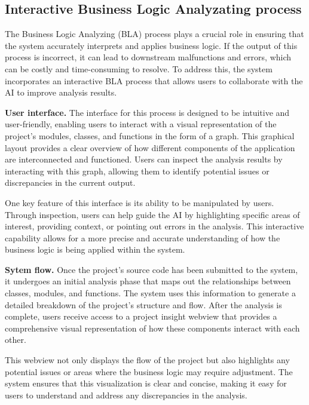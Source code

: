 \subsection{Interactive Business Logic Analyzating process}

\hspace{0.5cm}The Business Logic Analyzing (BLA) process plays a crucial role in ensuring that the system accurately interprets and applies business logic. If the output of this process is incorrect, it can lead to downstream malfunctions and errors, which can be costly and time-consuming to resolve. To address this, the system incorporates an interactive BLA process that allows users to collaborate with the AI to improve analysis results.

\hspace{0.5cm}\textbf{User interface.}	The interface for this process is designed to be intuitive and user-friendly, enabling users to interact with a visual representation of the project's modules, classes, and functions in the form of a graph. This graphical layout provides a clear overview of how different components of the application are interconnected and functioned. Users can inspect the analysis results by interacting with this graph, allowing them to identify potential issues or discrepancies in the current output.

\hspace{0.5cm}One key feature of this interface is its ability to be manipulated by users. Through inspection, users can help guide the AI by highlighting specific areas of interest, providing context, or pointing out errors in the analysis. This interactive capability allows for a more precise and accurate understanding of how the business logic is being applied within the system.

\hspace{0.5cm}\textbf{Sytem flow.}	Once the project's source code has been submitted to the system, it undergoes an initial analysis phase that maps out the relationships between classes, modules, and functions. The system uses this information to generate a detailed breakdown of the project's structure and flow. After the analysis is complete, users receive access to a project insight webview that provides a comprehensive visual representation of how these components interact with each other.

\hspace{0.5cm}This webview not only displays the flow of the project but also highlights any potential issues or areas where the business logic may require adjustment. The system ensures that this visualization is clear and concise, making it easy for users to understand and address any discrepancies in the analysis.

